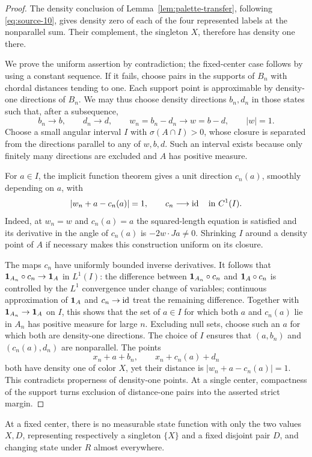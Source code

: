 \begin{proof}
The density conclusion of Lemma~\ref{lem:palette-transfer}, following
\eqref{eq:source-10}, gives density zero of each of the four represented
labels at the nonparallel sum.  Their complement, the singleton $X$,
therefore has density one there.

We prove the uniform assertion by contradiction; the fixed-center
case follows by using a constant sequence.  If it fails, choose pairs
in the supports of $B_n$ with chordal distances tending to one.  Each
support point is approximable by density-one directions of $B_n$.
We may thus choose density directions $b_n,d_n$ in those states such
that, after a subsequence,
\[
 b_n\to b,\qquad d_n\to d,\qquad
 w_n=b_n-d_n\to w=b-d,\qquad |w|=1.
\]
Choose a small angular interval $I$ with $\sigma(A\cap I)>0$, whose
closure is separated from the directions parallel to any of $w,b,d$.
Such an interval exists because only finitely many directions are
excluded and $A$ has positive measure.

For $a\in I$, the implicit function theorem gives a unit direction
$c_n(a)$, smoothly depending on $a$, with
\[
 |w_n+a-c_n(a)|=1,
 \qquad c_n\longrightarrow\operatorname{id}\quad\text{in }C^1(I).
\]
Indeed, at $w_n=w$ and $c_n(a)=a$ the squared-length equation is
satisfied and its derivative in the angle of $c_n(a)$ is
$-2w\cdot Ja\ne0$.  Shrinking $I$ around a density point of $A$ if
necessary makes this construction uniform on its closure.

The maps $c_n$ have uniformly bounded inverse derivatives.  It follows
that $\mathbf 1_{A_n}\circ c_n\to\mathbf 1_A$ in $L^1(I)$: the difference
between $\mathbf 1_{A_n}\circ c_n$ and $\mathbf 1_A\circ c_n$ is controlled by
the $L^1$ convergence under change of variables; continuous
approximation of $\mathbf 1_A$ and $c_n\to\operatorname{id}$ treat the remaining
difference.  Together with $\mathbf 1_{A_n}\to\mathbf 1_A$ on $I$, this shows
that the set of $a\in I$ for which both $a$ and $c_n(a)$ lie in $A_n$
has positive measure for large $n$.  Excluding null sets, choose such
an $a$ for which both are density-one directions.  The choice of $I$
ensures that $(a,b_n)$ and $(c_n(a),d_n)$ are nonparallel.  The points
\[
 x_n+a+b_n,\qquad x_n+c_n(a)+d_n
\]
both have density one of color $X$, yet their distance is
$|w_n+a-c_n(a)|=1$.  This contradicts properness of density-one points.
At a single center, compactness of the support turns exclusion of
distance-one pairs into the asserted strict margin.
\end{proof}

\begin{lemma}
\label{lem:transitions-two-state}
At a fixed center, there is no measurable state function with only the
two values $X,D$, representing respectively a singleton $\{X\}$ and
a fixed disjoint pair $D$, and changing state under $R$ almost
everywhere.
\end{lemma}

